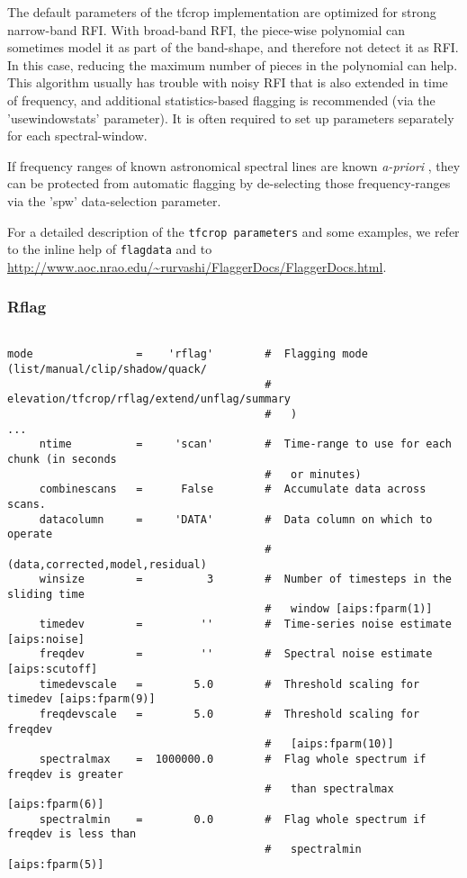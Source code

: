 The default parameters of the tfcrop implementation are optimized for
strong narrow-band RFI. With broad-band RFI, the piece-wise polynomial
can sometimes model it as part of the band-shape, and therefore not
detect it as RFI. In this case, reducing the maximum number of pieces
in the polynomial can help. This algorithm usually has trouble with
noisy RFI that is also extended in time of frequency, and additional
statistics-based flagging is recommended (via the 'usewindowstats'
parameter). It is often required to set up parameters separately for
each spectral-window.

If frequency ranges of known astronomical spectral lines are known {\it 
a-priori} , they can be protected from automatic flagging by
de-selecting those frequency-ranges via the 'spw' data-selection
parameter.


For a detailed description of the {\tt tfcrop parameters} and some
examples, we refer to the inline help of {\tt flagdata} and to
\url{http://www.aoc.nrao.edu/\~rurvashi/FlaggerDocs/FlaggerDocs.html}.

\subsubsection{Rflag}
\label{section:edit.flagdata.mode.rflag}

\small
\begin{verbatim}

mode                =    'rflag'        #  Flagging mode (list/manual/clip/shadow/quack/
                                        #   elevation/tfcrop/rflag/extend/unflag/summary
                                        #   )
...
     ntime          =     'scan'        #  Time-range to use for each chunk (in seconds
                                        #   or minutes)
     combinescans   =      False        #  Accumulate data across scans.
     datacolumn     =     'DATA'        #  Data column on which to operate
                                        #   (data,corrected,model,residual)
     winsize        =          3        #  Number of timesteps in the sliding time
                                        #   window [aips:fparm(1)]
     timedev        =         ''        #  Time-series noise estimate [aips:noise]
     freqdev        =         ''        #  Spectral noise estimate [aips:scutoff]
     timedevscale   =        5.0        #  Threshold scaling for timedev [aips:fparm(9)]
     freqdevscale   =        5.0        #  Threshold scaling for freqdev
                                        #   [aips:fparm(10)]
     spectralmax    =  1000000.0        #  Flag whole spectrum if freqdev is greater
                                        #   than spectralmax [aips:fparm(6)]
     spectralmin    =        0.0        #  Flag whole spectrum if freqdev is less than
                                        #   spectralmin [aips:fparm(5)]
                                       
\end{verbatim}
\normalsize

